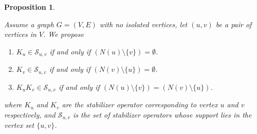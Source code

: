 \documentclass{article}
\newtheorem{prop}{Proposition}
\newcommand{\ket}[1]{|#1\rangle}
\newcommand{\identity}{\mathds{1}}
\begin{document}

 
 






\begin{prop}
\label{prop:conditions_for_belonging_to_support_stabilizer}

Assume a graph $G = (V, E)$ with no isolated vertices, let $(u, v)$ be a pair of vertices in $V$. We propose

\begin{enumerate}
    \item $ K_u \in \mathcal{S}_{u,v} $ if and only if $ (N(u) \setminus \{v\}) = \emptyset $.
    \item $ K_v \in \mathcal{S}_{u,v} $ if and only if $ (N(v) \setminus \{u\}) = \emptyset $.
    \item $ K_u K_v \in \mathcal{S}_{u,v} $ if and only if $ (N(u) \setminus \{v\}) = (N(v) \setminus \{u\}) $.
\end{enumerate}
 where $K_u$ and $K_v$ are the stabilizer operator corresponding to vertex $u$ and $v$ respectively, and $\mathcal{S}_{u,v}$ is the set of stabilizer operators whose support lies in the vertex set $\{u, v\}$. 

\end{prop}
\end{document}
